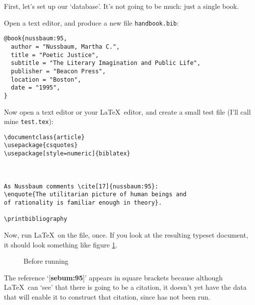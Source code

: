 First, let's set up our `database'. It's not going to be much: just a
single book.

Open a text editor, and produce a new file
\texttt{handbook.bib}:

\begin{verbatim}
@book{nussbaum:95,
  author = "Nussbaum, Martha C.",
  title = "Poetic Justice",
  subtitle = "The Literary Imagination and Public Life",
  publisher = "Beacon Press",
  location = "Boston",
  date = "1995",
}
\end{verbatim}

Now open a text editor or your \LaTeX\ editor, and create a small test
file (I'll call mine \texttt{test.tex}):

\begin{verbatim}
\documentclass{article}
\usepackage{csquotes}
\usepackage[style=numeric]{biblatex}



As Nussbaum comments \cite[17]{nussbaum:95}:
\enquote{The utilitarian picture of human beings and
of rationality is familiar enough in theory}.

\printbibliography

\end{verbatim}

Now, run \LaTeX\ on the file, once. If you look at the resulting
typeset document, it should look something like figure
\ref{nussbaum1}.

\begin{figure}
\caption{Before running }\label{nussbaum1}
\end{figure}

The reference `[\textbf{sebum:95}]' appears in square brackets
because although \LaTeX\ can `see' that there is going to be a
citation, it doesn't yet have the data that will enable it to
construct that citation, since  has not been run.

